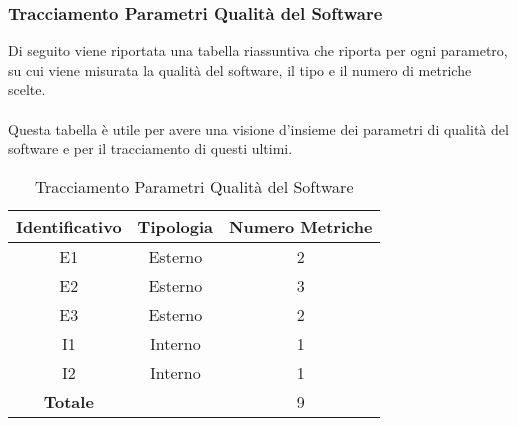 \subsubsection{Tracciamento Parametri Qualità del Software}
Di seguito viene riportata una tabella riassuntiva che riporta per ogni parametro, su cui viene misurata la qualità del software, il tipo e il numero di metriche scelte. \\ \\ Questa tabella è utile per avere una visione d'insieme dei parametri di qualità del software e per il tracciamento di questi ultimi.

\begin{table}[!htpb]
	\centering
	\renewcommand{\arraystretch}{2} 
		\begin{tabular}{|c|c|c|}
			\rowcolor{orange!50}
			\hline
			\textbf{Identificativo} & \textbf{Tipologia} & \textbf{Numero Metriche} \\ \hline
			E1 & Esterno & 2 \\ \hline
			E2 & Esterno & 3 \\ \hline  
			E3 & Esterno & 2 \\ \hline                       
			I1 & Interno & 1 \\ \hline                       
			I2 & Interno & 1 \\ \hline                       
			\textbf{Totale} &  & 9 \\ \hline   
		\end{tabular}
	\caption{Tracciamento Parametri Qualità del Software}
\end{table}

\clearpage
